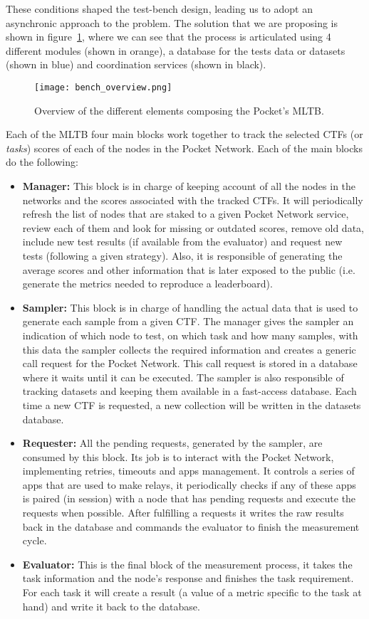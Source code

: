 These conditions shaped the test-bench design, leading us to adopt an asynchronic approach to the problem. The solution that we are proposing is shown in figure~\ref{fig:bench_overview}, where we can see that the process is articulated using 4 different modules (shown in orange), a database for the tests data or datasets (shown in blue) and coordination services (shown in black).
\begin{figure}[H]
    \centering
    \texttt{[image: bench\_overview.png]}
    \caption{Overview of the different elements composing the Pocket's \gls{MLTB}.}
    \label{fig:bench_overview}
\end{figure}
Each of the \gls{MLTB} four main blocks work together to track the selected \glspl{CTF} (or \emph{tasks}) scores of each of the nodes in the Pocket Network. Each of the main blocks do the following:
\begin{itemize}
    \item \textbf{Manager:} This block is in charge of keeping account of all the nodes in the networks and the scores associated with the tracked \glspl{CTF}. It will periodically refresh the list of nodes that are staked to a given Pocket Network service, review each of them and look for missing or outdated scores, remove old data, include new test results (if available from the evaluator) and request new tests (following a given strategy). Also, it is responsible of generating the average scores and other information that is later exposed to the public (i.e. generate the metrics needed to reproduce a leaderboard).
    \item \textbf{Sampler:} This block is in charge of handling the actual data that is used to generate each sample from a given \gls{CTF}. The manager gives the sampler an indication of which node to test, on which task and how many samples, with this data the sampler collects the required information and creates a generic call request for the Pocket Network. This call request is stored in a database where it waits until it can be executed. The sampler is also responsible of tracking datasets and keeping them available in a fast-access database. Each time a new \gls{CTF} is requested, a new collection will be written in the datasets database.
    \item \textbf{Requester:} All the pending requests, generated by the sampler, are consumed by this block. Its job is to interact with the Pocket Network, implementing retries, timeouts and apps management. It controls a series of apps that are used to make relays, it periodically checks if any of these apps is paired (in session) with a node that has pending requests and execute the requests when possible. After fulfilling a requests it writes the raw results back in the database and commands the evaluator to finish the measurement cycle. 
    \item \textbf{Evaluator:} This is the final block of the measurement process, it takes the task information and the node's response and finishes the task requirement. For each task it will create a result (a value of a metric specific to the task at hand) and write it back to the database.
\end{itemize}

